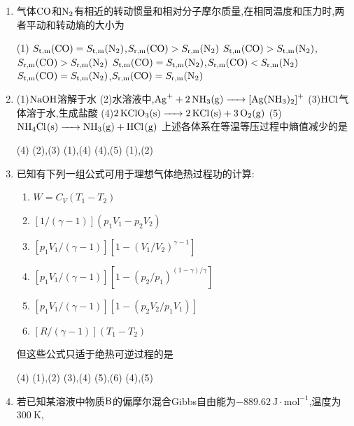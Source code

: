 \begin{enumerate}[label=\arabic*., itemsep=1.5ex]
    \item 气体$\ce{CO}$和$\ce{N2}$有相近的转动惯量和相对分子摩尔质量,在相同温度和压力时,两者平动和转动熵的大小为
    \begin{tasks}(1)
        \task $S_{\text{t,m}}(\ce{CO})=S_{\text{t,m}}(\ce{N2})$,\quad $S_{\text{r,m}}(\ce{CO})>S_{\text{r,m}}(\ce{N2})$
        \task $S_{\text{t,m}}(\ce{CO})>S_{\text{t,m}}(\ce{N2})$,\quad $S_{\text{r,m}}(\ce{CO})>S_{\text{r,m}}(\ce{N2})$
        \task $S_{\text{t,m}}(\ce{CO})=S_{\text{t,m}}(\ce{N2})$,\quad $S_{\text{r,m}}(\ce{CO})<S_{\text{r,m}}(\ce{N2})$
        \task $S_{\text{t,m}}(\ce{CO})=S_{\text{t,m}}(\ce{N2})$,\quad $S_{\text{r,m}}(\ce{CO})=S_{\text{r,m}}(\ce{N2})$
    \end{tasks}
    \item (1)$\ce{NaOH}$溶解于水
    (2)水溶液中,$\ce{Ag^+ + 2NH3(g) -> [Ag(NH3)2]^+}$
    (3)$\ce{HCl}$气体溶于水,生成盐酸
    (4)$\ce{2KClO3(s) -> 2KCl(s) + 3O2(g)}$
    (5)$\ce{NH4Cl(s) -> NH3(g) + HCl(g)}$
    上述各体系在等温等压过程中熵值减少的是
    \begin{tasks}(4)
        \task (2),(3)
        \task (1),(4)
        \task (4),(5)
        \task (1),(2)
    \end{tasks}
    \item 已知有下列一组公式可用于理想气体绝热过程功的计算:
    \begin{enumerate}[label=(\arabic*), itemsep=1ex]
        \item $W=C_V(T_1-T_2)$
        \item $[1/(\gamma-1)](p_1V_1-p_2V_2)$
        \item $[p_1V_1/(\gamma-1)][1-(V_1/V_2)^{\gamma-1}]$
        \item $[p_1V_1/(\gamma-1)][1-(p_2/p_1)^{(1-\gamma)/\gamma}]$
        \item $[p_1V_1/(\gamma-1)][1-(p_2V_2/p_1V_1)]$
        \item $[R/(\gamma-1)](T_1-T_2)$
    \end{enumerate}
    但这些公式只适于绝热可逆过程的是
    \begin{tasks}(4)
        \task (1),(2)
        \task (3),(4)
        \task (5),(6)
        \task (4),(5)
    \end{tasks}
    \item 若已知某溶液中物质$\ce{B}$的偏摩尔混合Gibbs自由能为$-889.62\ \mathrm{J\cdot mol^{-1}}$,温度为$300\ \mathrm{K}$,
    

\end{enumerate}
